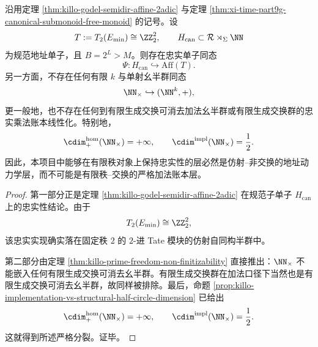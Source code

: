 \begin{theorem}[有限维忠实实现的仿射必然性]\label{thm:xi-time-part75-faithful-finite-dimensional-realization-affine-necessity}
沿用定理 \ref{thm:killo-godel-semidir-affine-2adic} 与定理 \ref{thm:xi-time-part9g-canonical-submonoid-free-monoid} 的记号。设
\[
T:=T_2(E_{\min})\cong \ZZ_2^2,
\qquad
H_{\mathrm{can}}\subset \mathcal R\rtimes_{\Sigma}\NN
\]
为规范地址单子，且 \(B=2^L>M\)。则存在忠实单子同态
\[
\Psi:H_{\mathrm{can}}\hookrightarrow \mathrm{Aff}(T).
\]
另一方面，不存在任何有限 \(k\) 与单射幺半群同态
\[
\NN_{\times}\hookrightarrow (\NN^k,+),
\]
更一般地，也不存在任何到有限生成交换可消去加法幺半群或有限生成交换群的忠实乘法账本线性化。特别地，
\[
\cdim^{\mathrm{hom}}_{+}(\NN_{\times})=+\infty,
\qquad
\cdim^{\mathrm{impl}}(\NN_{\times})=\frac12.
\]
因此，本项目中能够在有限秩对象上保持忠实性的层必然是仿射--非交换的地址动力学层，而不可能是有限秩--交换的严格加法账本层。
\end{theorem}
\begin{proof}
第一部分正是定理 \ref{thm:killo-godel-semidir-affine-2adic} 在规范子单子 \(H_{\mathrm{can}}\) 上的忠实性结论。由于
\[
T_2(E_{\min})\cong \ZZ_2^2,
\]
该忠实实现确实落在固定秩 \(2\) 的 \(2\)-进 Tate 模块的仿射自同构半群中。

第二部分由定理 \ref{thm:killo-prime-freedom-non-finitizability} 直接推出：\(\NN_{\times}\) 不能嵌入任何有限生成交换可消去幺半群。有限生成交换群在加法口径下当然也是有限生成交换可消去幺半群，故同样被排除。最后，命题 \ref{prop:killo-implementation-vs-structural-half-circle-dimension} 已给出
\[
\cdim^{\mathrm{hom}}_{+}(\NN_{\times})=+\infty,
\qquad
\cdim^{\mathrm{impl}}(\NN_{\times})=\frac12.
\]
这就得到所述严格分裂。证毕。
\end{proof}

